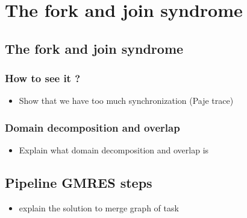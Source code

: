 \documentclass[oneside,12t]{classes/Thesis}
\begin{document}
\chapter{The fork and join syndrome}
\minitoc
\vspace{1cm}


\section{The fork and join syndrome}
\subsection{How to see it ?}
  \begin{itemize}
    \item Show that we have too much synchronization (Paje trace)
  \end{itemize}
\subsection{Domain decomposition and overlap}
  \begin{itemize}
    \item Explain what domain decomposition and overlap is
  \end{itemize}


\section{Pipeline GMRES steps}
  \begin{itemize}
    \item explain the solution to merge graph of task
  \end{itemize}
\end{document}

